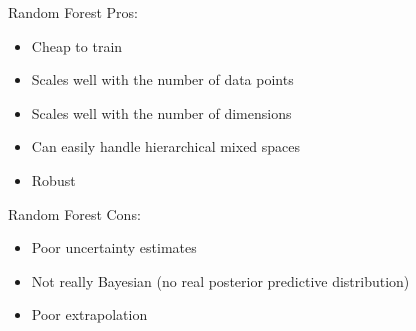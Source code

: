\documentclass[11pt,compress,t,notes=noshow, xcolor=table]{beamer}
\begin{document}
\begin{frame}{Random Forest}
Pros:
\begin{itemize}
 \item Cheap to train
 \item Scales well with the number of data points
 \item Scales well with the number of dimensions
 \item Can easily handle hierarchical mixed spaces
 \item Robust
\end{itemize}
\end{frame}

\begin{frame}{Random Forest}
Cons:
\begin{itemize}
  \item Poor uncertainty estimates
  \item Not really Bayesian (no real posterior predictive distribution)
  \item Poor extrapolation
\end{itemize}
\end{frame}

\endlecture
\end{document}
